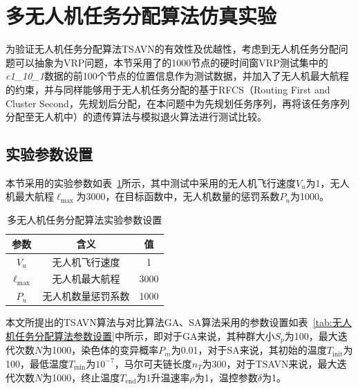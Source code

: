 \section{多无人机任务分配算法仿真实验}

为验证无人机任务分配算法TSAVN的有效性及优越性，考虑到无人机任务分配问题可以抽象为VRP问题，本节采用了\citet{gehring2002ParallelizationTwoPhaseMetaheuristic}的1000节点的硬时间窗VRP测试集中的\textit{c1\_10\_1}数据的前100个节点的位置信息作为测试数据，并加入了无人机最大航程的约束，并与同样能够用于无人机任务分配的基于RFCS（Routing First and Cluster Second，先规划后分配，在本问题中为先规划任务序列，再将该任务序列分配至无人机中）的遗传算法与模拟退火算法进行测试比较。

\subsection{实验参数设置}

本节采用的实验参数如表~\ref{tab:多无人机任务分配算法实验参数设置}所示，其中测试中采用的无人机飞行速度\(V_u\)为1，无人机最大航程\(\ell_{\textrm{max}}\)为3000，在目标函数中，无人机数量的惩罚系数\(P_u\)为1000。

\begin{table}[!htbp]
    \caption{多无人机任务分配算法实验参数设置}
    \label{tab:多无人机任务分配算法实验参数设置}
    \centering
    \begin{tabular}{c c c}
        \toprule
        \textbf{参数} & \textbf{含义} & \textbf{值} \\
        \midrule
        \( V_u \) & 无人机飞行速度 & 1 \\
        \( \ell_{\textrm{max}} \) & 无人机最大航程 & 3000 \\
        \( P_u \) & 无人机数量惩罚系数 & 1000\\
        \bottomrule
    \end{tabular}
\end{table}

本文所提出的TSAVN算法与对比算法GA、SA算法采用的参数设置如表~\ref{tab:无人机任务分配算法参数设置}中所示，即对于GA来说，其种群大小\(S_p\)为100，最大迭代次数\(N\)为1000，染色体的变异概率\(P_m\)为0.01，对于SA来说，其初始的温度\(T_{\textrm{init}}\)为100，最低温度\( T_{\textrm{min}} \)为\(10^{-7}\)，马尔可夫链长度\( n_T \)为300，对于TSAVN来说，最大迭代次数\(N\)为1000，终止温度\( T_{\textrm{end}} \)为1升温速率\( \rho \)为1，温控参数\( \delta \)为1。

